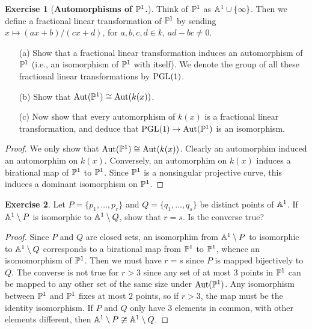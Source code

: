 \documentclass[11pt]{book}
\theoremstyle{definition}
\newtheorem{exercise}{Exercise}[section]
\begin{document}
\begin{exercise}[\textbf{Automorphisms of $\P^1$.}]
Think of $\P^1$ as $\A^1\cup\{\infty\}$. Then we define a fractional linear transformation of $\P^1$ by sending $x\mapsto(ax+b)/(cx+d)$, for $a,b,c,d\in k$, $ad-bc\neq 0$.
\begin{itemize}
\item[(a)] Show that a fractional linear transformation induces an automorphism of $\P^1$ (i.e., an isomorphism of $\P^1$ with itself). We denote the group of all these fractional linear transformations by $\PGL(1)$.
\item[(b)] Show that $\Aut(\P^1)\cong\Aut(k(x))$.
\item[(c)] Now show that every automorphism of $k(x)$ is a fractional linear transformation, and deduce that $\PGL(1)\to\Aut(\P^1)$ is an isomorphism.  
\end{itemize}
\end{exercise}
\begin{proof}
We only show that $\Aut(\P^1)\cong\Aut(k(x))$. Clearly an automorphim induced an automorphim on $k(x)$. Conversely, an automorphim on $k(x)$ induces a birational map of $\P^1$ to $\P^1$. Since $\P^1$ is a nonsingular projective curve, this induces a dominant isomorphism on $\P^1$.
\end{proof}
\begin{exercise}
Let $P=\{p_1,\dots,p_r\}$ and $Q=\{q_1,\dots,q_s\}$ be distinct points of $\A^1$. If $\A^1\setminus P$ is isomorphic to $\A^1\setminus Q$, show that $r=s$. Is the converse true?
\end{exercise}
\begin{proof}
Since $P$ and $Q$ are closed sets, an isomorphim from $\A^1\setminus P$ to isomorphic to $\A^1\setminus Q$ corresponds to a birational map from $\P^1$ to $\P^1$, whence an isomomorphism of $\P^1$. Then we must have $r=s$ since $P$ is mapped bijectively to $Q$. The converse is not true for $r>3$ since any set of at most $3$ points in $\P^1$ can be mapped to any other set of the same size under $\Aut(\P^1)$. Any isomorphism between $\P^1$ and $\P^1$ fixes at most $2$ points, so if $r>3$, the map must be the identity isomorphism. If $P$ and $Q$ only have $3$ elements in common, with other elements different, then $\A^1\setminus P\ncong\A^1\setminus Q$.
\end{proof}
\end{document}
